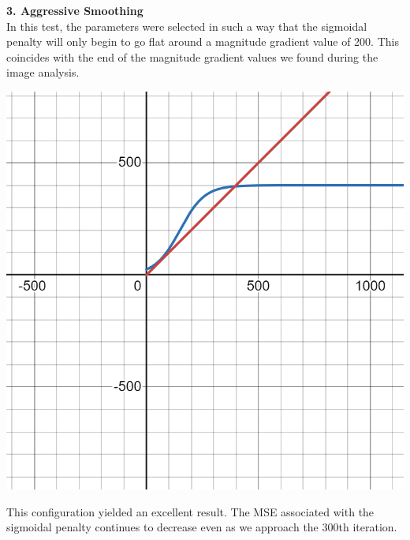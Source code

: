 \documentclass{article}
\begin{document}
  \newpage
  \noindent
  \textbf{3. Aggressive Smoothing}\\
  In this test, the parameters were selected in such a way
  that the sigmoidal penalty will only begin to go flat
  around a magnitude gradient value of 200. This coincides
  with the end of the magnitude gradient values we found during
  the image analysis.\\
  \begin{center}
    \includegraphics[scale=0.2]{../report_images/aggressive_smoothing.png}\\
  \end{center}
  \vspace{12pt}

  \noindent
  This configuration yielded an excellent result. The MSE
  associated with the sigmoidal penalty continues to
  decrease even as we approach the 300th iteration.
\end{document}
